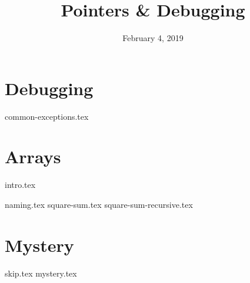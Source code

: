 \documentclass[11pt]{exam}
\title{Pointers \& Debugging}
\date{February 4, 2019}
\begin{document}
\maketitle

\section{Debugging}
\begin{questions}
{common-exceptions.tex}
\end{questions}

\section{Arrays}
{intro.tex}
\begin{questions}
{naming.tex}
{square-sum.tex}
{square-sum-recursive.tex}
\end{questions}

\section{Mystery}
\begin{questions}
{skip.tex}
{mystery.tex}
\end{questions}
\end{document}
